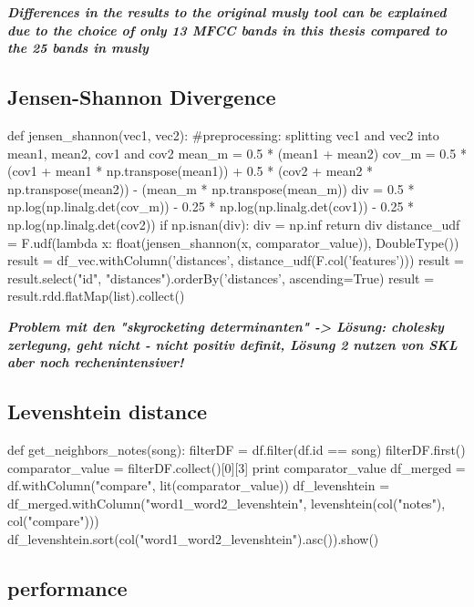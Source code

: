 \noindent\textbf{\textit{Differences in the results to the original musly tool can be explained due to the choice of only 13 MFCC bands in this thesis compared to the 25 bands in musly}\cite{musly1}}

\subsection{Jensen-Shannon Divergence}

\begin{pythonCode}
def jensen_shannon(vec1, vec2):
	#preprocessing: splitting vec1 and vec2 into mean1, mean2, cov1 and cov2
    mean_m = 0.5 * (mean1 + mean2)
    cov_m = 0.5 * (cov1 + mean1 * np.transpose(mean1)) + 0.5 * (cov2 + mean2 * np.transpose(mean2)) - (mean_m * np.transpose(mean_m))
    div = 0.5 * np.log(np.linalg.det(cov_m)) - 0.25 * np.log(np.linalg.det(cov1)) - 0.25 * np.log(np.linalg.det(cov2))  
    if np.isnan(div):
        div = np.inf
    return div
distance_udf = F.udf(lambda x: float(jensen_shannon(x, comparator_value)), DoubleType())
result = df_vec.withColumn('distances', distance_udf(F.col('features')))
result = result.select("id", "distances").orderBy('distances', ascending=True)
result = result.rdd.flatMap(list).collect()
\end{pythonCode}

\noindent\textbf{\textit{Problem mit den "skyrocketing determinanten" -> Lösung: cholesky zerlegung, geht nicht - nicht positiv definit, Lösung 2 nutzen von SKL aber noch rechenintensiver!}\cite[p.45]{schnitzer1}}

\subsection{Levenshtein distance}

\begin{pythonCode}
def get_neighbors_notes(song):
    filterDF = df.filter(df.id == song)
    filterDF.first()
    comparator_value = filterDF.collect()[0][3] 
    print comparator_value
    df_merged = df.withColumn("compare", lit(comparator_value))
    df_levenshtein = df_merged.withColumn("word1_word2_levenshtein", levenshtein(col("notes"), col("compare")))
    df_levenshtein.sort(col("word1_word2_levenshtein").asc()).show()
\end{pythonCode}

\subsection{performance}

